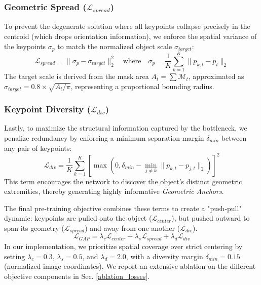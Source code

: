 \subsubsection{Geometric Spread ($\mathcal{L}_{spread}$)}
To prevent the degenerate solution where all keypoints collapse precisely in the centroid (which drops orientation information), we enforce the spatial variance of the keypoints $\sigma_p$ to match the normalized object scale $\sigma_{target}$:
\begin{equation}
    \mathcal{L}_{spread} = \| \sigma_p - \sigma_{target} \|_2^2 \quad \text{where} \quad \sigma_p = \frac{1}{K} \sum_{k=1}^K \| p_{k,t} - \bar{p}_t \|_2
\end{equation}
The target scale is derived from the mask area $A_t = \sum \mathcal{M}_t$, approximated as $\sigma_{target} = 0.8 \times \sqrt{A_t / \pi}$, representing a proportional bounding radius.

\subsubsection{Keypoint Diversity ($\mathcal{L}_{div}$)}
Lastly, to maximize the structural information captured by the bottleneck, we penalize redundancy by enforcing a minimum separation margin $\delta_{min}$ between any pair of keypoints:
\begin{equation}
    \mathcal{L}_{div} = \frac{1}{K} \sum_{k=1}^K \left[ \max\left(0, \delta_{min} - \min_{j \neq k} \| p_{k,t} - p_{j,t} \|_2 \right) \right]^2
\end{equation}
This term encourages the network to discover the object's distinct geometric extremities, thereby generating highly informative \emph{Geometric Anchors}.

The final pre-training objective combines these terms to create a "push-pull" dynamic: keypoints are pulled onto the object ($\mathcal{L}_{center}$), but pushed outward to span its geometry ($\mathcal{L}_{spread}$) and away from one another ($\mathcal{L}_{div}$).
\begin{equation}
    \mathcal{L}_{GAP} = \lambda_c \mathcal{L}_{center} + \lambda_s \mathcal{L}_{spread} + \lambda_d \mathcal{L}_{div}
\end{equation}
In our implementation, we prioritize spatial coverage over strict centering by setting $\lambda_c = 0.3$, $\lambda_s = 0.5$, and $\lambda_d = 2.0$, with a diversity margin $\delta_{min} = 0.15$ (normalized image coordinates). We report an extensive ablation on the different objective components in Sec. \ref{ablation_losses}.

